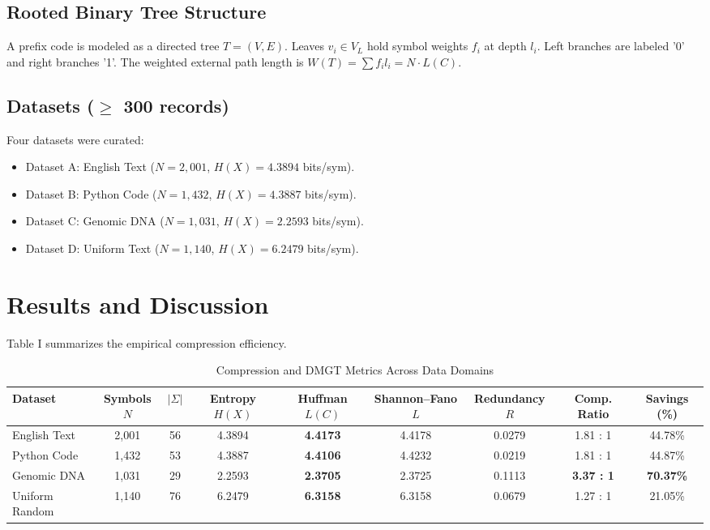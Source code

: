 \documentclass[conference]{IEEEtran}
\begin{document}
\subsection{Rooted Binary Tree Structure}
A prefix code is modeled as a directed tree $T = (V, E)$. Leaves $v_i \in V_L$ hold symbol weights $f_i$ at depth $l_i$. Left branches are labeled '0' and right branches '1'. The weighted external path length is $W(T) = \sum f_i l_i = N \cdot L(C)$.

\subsection{Datasets ($\ge$ 300 records)}
Four datasets were curated:
\begin{itemize}
    \item Dataset A: English Text ($N = 2,001$, $H(X) = 4.3894$ bits/sym).
    \item Dataset B: Python Code ($N = 1,432$, $H(X) = 4.3887$ bits/sym).
    \item Dataset C: Genomic DNA ($N = 1,031$, $H(X) = 2.2593$ bits/sym).
    \item Dataset D: Uniform Text ($N = 1,140$, $H(X) = 6.2479$ bits/sym).
\end{itemize}

\section{Results and Discussion}
Table I summarizes the empirical compression efficiency.

\begin{table}[t]
\caption{Compression and DMGT Metrics Across Data Domains}
\centering
\begin{tabular}{|l|c|c|c|c|c|c|c|c|}
\hline
\textbf{Dataset} & \textbf{Symbols $N$} & \textbf{$|\Sigma|$} & \textbf{Entropy $H(X)$} & \textbf{Huffman $L(C)$} & \textbf{Shannon--Fano $L$} & \textbf{Redundancy $R$} & \textbf{Comp. Ratio} & \textbf{Savings (\%)} \\
\hline
English Text & 2,001 & 56 & 4.3894 & \textbf{4.4173} & 4.4178 & 0.0279 & 1.81 : 1 & 44.78\% \\
Python Code & 1,432 & 53 & 4.3887 & \textbf{4.4106} & 4.4232 & 0.0219 & 1.81 : 1 & 44.87\% \\
Genomic DNA & 1,031 & 29 & 2.2593 & \textbf{2.3705} & 2.3725 & 0.1113 & \textbf{3.37 : 1} & \textbf{70.37\%} \\
Uniform Random & 1,140 & 76 & 6.2479 & \textbf{6.3158} & 6.3158 & 0.0679 & 1.27 : 1 & 21.05\% \\
\hline
\end{tabular}
\end{table}
\end{document}

